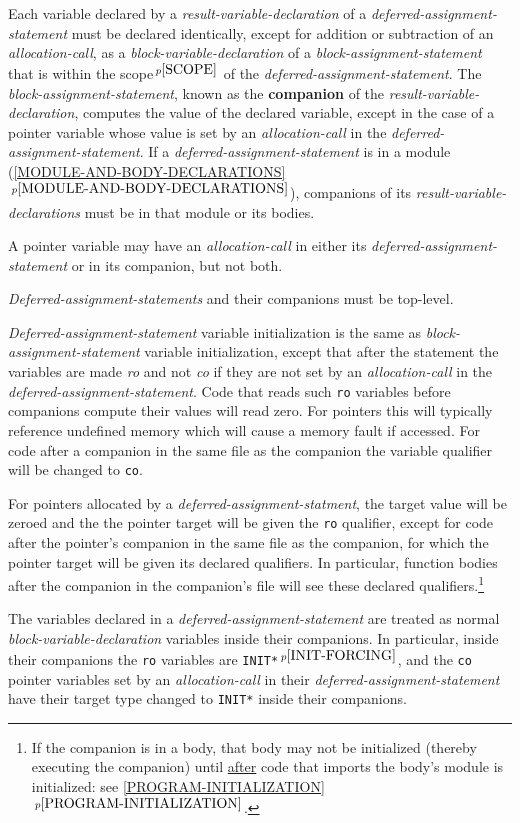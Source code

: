 \documentclass[12pt]{article}
\newcommand{\key}[1]{{\rm \bfseries #1}}
\newcommand{\itemref}[1]{\ref{#1}$\,^{p\pageref{#1}}$}
\newcommand{\pagnote}[1]{$\,^{p\pageref{#1}}$}
\begin{document}
Each variable declared by a {\em result-variable-declaration}
of a {\em deferred-assignment-statement} must be declared identically,
except for addition or subtraction of an {\em allocation-call},
as a {\em block-variable-declaration} of a {\em block-assignment-statement}
that is within the scope\pagnote{SCOPE} of the
{\em deferred-assignment-statement}.  The {\em block-assignment-statement},
known as the \key{companion} of the {\em result-variable-declaration},
computes the value of the
declared variable, except in the case of a pointer variable whose value is
set by an {\em allocation-call} in the {\em deferred-assignment-statement}.
If a {\em deferred-assignment-statement} is in a module
(\itemref{MODULE-AND-BODY-DECLARATIONS}), companions
of its {\em result-variable-declarations}
must be in that module or its bodies.

A pointer variable may have an {\em allocation-call} in either its
{\em deferred-assignment-statement} or in its companion, but not
both.

{\em Deferred-assignment-statements} and their companions must be
top-level.

{\em Deferred-assignment-statement} variable initialization is the
same as {\em block-assignment-state\-ment} variable initialization,
except that after the statement the variables
are made {\em ro} and not {\em co} if they are not set
by an {\em allocation-call} in the {\em deferred-assignment-statement}.
Code that reads such {\tt ro} variables
before companions compute their values will
read zero.
For pointers this will typically reference undefined memory which
will cause a memory fault if accessed.
For code after a companion in the same file as the companion the
variable qualifier will be changed to {\tt co}.


For pointers allocated by a {\em deferred-assignment-statment},
the target value will be zeroed and the
the pointer target will be given the {\tt ro} qualifier, except for
code after the pointer's companion in the same file as the companion,
for which the pointer target will be given its declared qualifiers.
In particular, function bodies after the companion in the companion's
file will see these declared qualifiers.\footnote{
If the companion is in a body, that body may not be initialized
(thereby executing the companion)
until \underline{after} code that imports the body's module is initialized:
see \itemref{PROGRAM-INITIALIZATION}.}


The variables declared in a {\em deferred-assignment-statement} are treated as
normal {\em block-vari\-able-declaration} variables inside their companions.
In particular, inside their companions
the {\tt ro} variables are {\tt *INIT*}\pagnote{INIT-FORCING},
and the {\tt co} pointer variables set by
an {\em allocation-call} in their {\em deferred-assignment-statement}
have their target type changed to {\tt *INIT*}
inside their companions.
\end{document}
